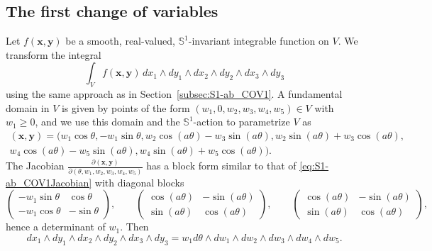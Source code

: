 \documentclass[twoside]{amsart}
\theoremstyle{definition}
\theoremstyle{remark}
\numberwithin{equation}{section}
\newcommand{\Sp}{\mathbb{S}}
\begin{document}

\subsection{The first change of variables}
\label{subsec:S1-1aa_COV1}

Let $f(\mathbf{x}, \mathbf{y})$ be a smooth, real-valued, $\Sp^1$-invariant integrable function on $V$. We transform the integral
\begin{equation}
\label{eq:S1-1aa_Int0}
    \int_V f(\mathbf{x}, \mathbf{y}) \, dx_1 \wedge dy_1 \wedge dx_2\wedge dy_2 \wedge dx_3\wedge dy_3
\end{equation}
using the same approach as in Section~\ref{subsec:S1-ab_COV1}. A fundamental domain in $V$ is given by points of the form $(w_1, 0, w_2, w_3, w_4, w_5) \in V$
with $w_1\geq 0$, and we use this domain and the $\Sp^1$-action to parametrize $V$ as
\begin{multline}
\label{eq:S1-1aa_COV1}
    (\mathbf{x}, \mathbf{y})
    =
    \big(   w_1 \cos\theta,
            - w_1 \sin\theta,
            w_2 \cos(a\theta) - w_3 \sin(a\theta),
            w_2 \sin(a\theta) + w_3 \cos(a\theta),
    \\
            w_4 \cos(a\theta) - w_5 \sin(a\theta),
            w_4 \sin(a\theta) + w_5 \cos(a\theta)
    \big).
\end{multline}
The Jacobian $\frac{\partial (\mathbf{x}, \mathbf{y})}{ \partial (\theta, w_1, w_2, w_3, w_4, w_5)}$ has a block form similar to that of
\eqref{eq:S1-ab_COV1Jacobian} with diagonal blocks
\[
        \begin{pmatrix}
        - w_1\sin\theta   &   \cos\theta
        \\
        - w_1\cos\theta   &   - \sin\theta
        \end{pmatrix},
        \qquad
        \begin{pmatrix}
        \cos(a \theta)   &  - \sin(a\theta)
        \\
        \sin(a \theta)  &   \cos(a\theta)
        \end{pmatrix},
        \qquad
        \begin{pmatrix}
        \cos(a \theta)   &  - \sin(a\theta)
        \\
        \sin(a \theta)  &   \cos(a\theta)
        \end{pmatrix},
\]
hence a determinant of $w_1$. Then
\[
    dx_1\wedge dy_1 \wedge dx_2 \wedge dy_2 \wedge dx_3 \wedge dy_3
    =
    w_1 d\theta \wedge dw_1 \wedge dw_2 \wedge dw_3 \wedge dw_4 \wedge dw_5.
\]
\end{document}
